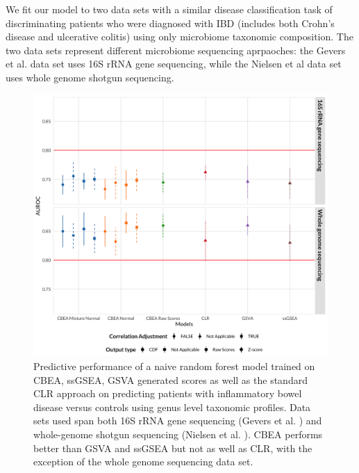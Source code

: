 \documentclass[10pt,letterpaper]{article}
\begin{document}
We fit our model to two data sets with a similar disease classification task of discriminating patients who were diagnosed with IBD (includes both Crohn's disease and ulcerative colitis) using only microbiome taxonomic composition. The two data sets represent different microbiome sequencing aprpaoches: the Gevers et al. \cite{gevers2014} data set uses 16S rRNA gene sequencing, while the Nielsen et al \cite{nielsen2014} data set uses whole genome shotgun sequencing. 

\begin{figure}[!h]
    \centering
    \includegraphics[width = \linewidth]{figures/data_pred.png}
    \caption{Predictive performance of a naive random forest model trained on CBEA, ssGSEA, GSVA generated scores as well as the standard CLR approach on predicting patients with inflammatory bowel disease versus controls using genus level taxonomic profiles. Data sets used span both 16S rRNA gene sequencing (Gevers et al. \cite{gevers2014}) and whole-genome shotgun sequencing (Nielsen et al. \cite{nielsen2014}). CBEA performs better than GSVA and ssGSEA but not as well as CLR, with the exception of the whole genome sequencing data set.}
    \label{fig:6}
\end{figure}
\end{document}
